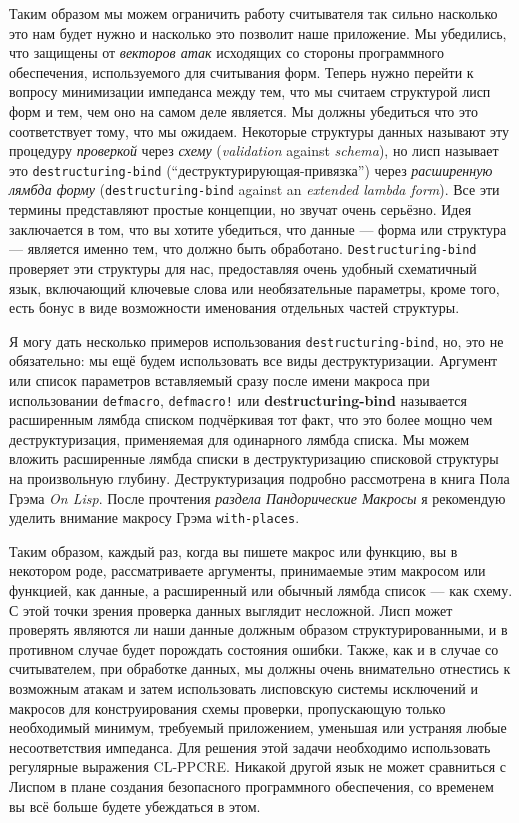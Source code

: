 Таким образом мы можем ограничить работу считывателя так сильно насколько это нам будет нужно и насколько это позволит наше приложение. Мы убедились, что защищены от \emph{векторов атак} исходящих со стороны программного обеспечения, используемого для считывания форм. Теперь нужно перейти к вопросу минимизации импеданса между тем, что мы считаем структурой лисп форм и тем, чем оно на самом деле является. Мы должны убедиться что это соответствует тому, что мы ожидаем. Некоторые структуры данных называют эту процедуру \emph{проверкой} через \emph{схему} (\emph{validation} against \emph{schema}), но лисп называет это \verb"destructuring-bind" (``деструктурирующая-привязка'') через \emph{расширенную лямбда форму} (\verb"destructuring-bind" against an \emph{extended lambda form}). Все эти термины представляют простые концепции, но звучат очень серьёзно. Идея заключается в том, что вы хотите убедиться, что данные --- форма или структура --- является именно тем, что должно быть обработано. \verb"Destructuring-bind" проверяет эти структуры для нас, предоставляя очень удобный схематичный язык, включающий ключевые слова или необязательные параметры, кроме того, есть бонус в виде возможности именования отдельных частей структуры.

Я могу дать несколько примеров использования \verb"destructuring-bind", но, это не обязательно: мы ещё будем использовать все виды деструктуризации. Аргумент или список параметров вставляемый сразу после имени макроса при использовании \verb"defmacro", \verb"defmacro!" или \textbf{de\-struc\-tu\-ring-bi\-nd} называется расширенным лямбда списком подчёркивая тот факт, что это более мощно чем деструктуризация, применяемая для одинарного лямбда списка. Мы можем вложить расширенные лямбда списки в деструктуризацию списковой структуры на произвольную глубину. Деструктуризация подробно рассмотрена в книга Пола Грэма \emph{On Lisp}. После прочтения \emph{раздела Пандорические Макросы} я рекомендую уделить внимание макросу Грэма \verb"with-places".

Таким образом, каждый раз, когда вы пишете макрос или функцию, вы в некотором роде, рассматриваете аргументы, принимаемые этим макросом или функцией, как данные, а расширенный или обычный лямбда список --- как схему. С этой точки зрения проверка данных выглядит несложной. Лисп может проверять являются ли наши данные должным образом структурированными, и в противном случае будет порождать состояния ошибки. Также, как и в случае со считывателем, при обработке данных, мы должны очень внимательно отнестись к возможным атакам и затем использовать лисповскую системы исключений и макросов для конструирования схемы проверки, пропускающую только необходимый минимум, требуемый приложением, уменьшая или устраняя любые несоответствия импеданса. Для решения этой задачи необходимо использовать регулярные выражения CL-PPCRE. Никакой другой язык не может сравниться с Лиспом в плане создания безопасного программного обеспечения, со временем вы всё больше будете убеждаться в этом.
